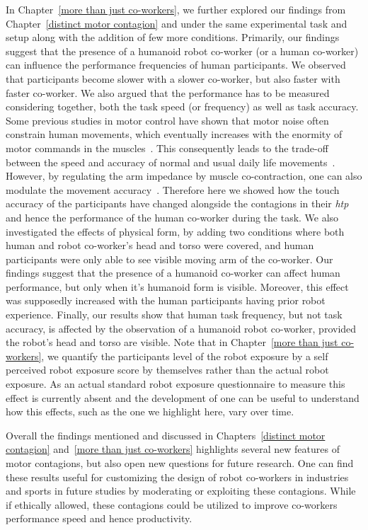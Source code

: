In Chapter~\ref{more than just co-workers}, we further explored our findings from Chapter~\ref{distinct motor contagion} and under the same experimental task and setup along with the addition of few more conditions. Primarily, our findings suggest that the presence of a humanoid robot co-worker (or a human co-worker) can influence the performance frequencies of human participants. We observed that participants become slower with a slower co-worker, but also faster with faster co-worker. We also argued that the performance has to be measured considering together, both the task speed (or frequency) as well as task accuracy. Some previous studies in motor control have shown that motor noise often constrain human movements, which eventually increases with the enormity of motor commands in the muscles~\cite{Harris:Nature:1998}. This consequently leads to the trade-off between the speed and accuracy of normal and usual daily life movements~\cite{Fitts:JEP:1954}. However, by regulating the arm impedance by muscle co-contraction, one can also modulate the movement accuracy~\cite{Burdet:nature:2001, Franklin:JoN:2008, Ganesh:RAS:2013}. Therefore here we showed how the touch accuracy of the participants have changed alongside the contagions in their {\it htp} and hence the performance of the human co-worker during the task. We also investigated the effects of physical form, by adding two conditions where both human and robot co-worker's head and torso were covered, and human participants were only able to see visible moving arm of the co-worker. Our findings suggest that the presence of a humanoid co-worker can affect human performance, but only when it's humanoid form is visible. Moreover, this effect was supposedly increased with the human participants having prior robot experience. Finally, our results show that human task frequency, but not task accuracy, is affected by the observation of a humanoid robot co-worker, provided the robot's head and torso are visible. Note that in Chapter~\ref{more than just co-workers}, we quantify the participants level of the robot exposure by a self perceived robot exposure score by themselves rather than the actual robot exposure. As an actual standard robot exposure questionnaire to measure this effect is currently absent and the development of one can be useful to understand how this effects, such as the one we highlight here, vary over time.

Overall the findings mentioned and discussed in Chapters~\ref{distinct motor contagion} and~\ref{more than just co-workers} highlights several new features of motor contagions, but also open new questions for future research. One can find these results useful for customizing the design of robot co-workers in industries and sports in future studies by moderating or exploiting these contagions. While if ethically allowed, these contagions could be utilized to improve co-workers performance speed and hence productivity.





